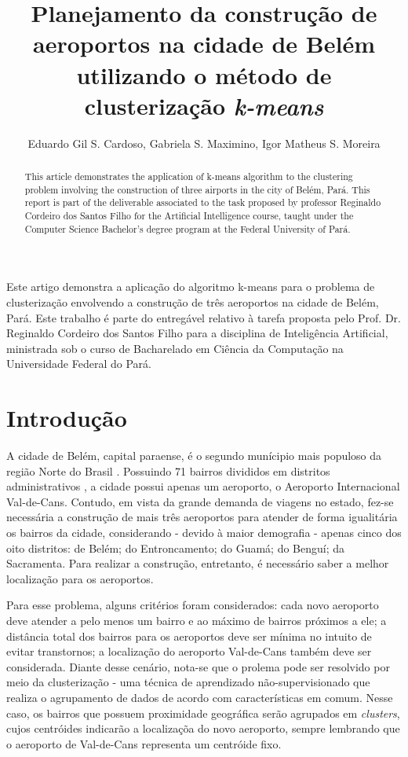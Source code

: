 \documentclass[12pt]{article}
\title{Planejamento da construção de aeroportos na cidade de Belém utilizando o método de clusterização \textit{k-means}}
\author{Eduardo Gil S. Cardoso\inst{1}, Gabriela S. Maximino\inst{1}, Igor Matheus S. Moreira\inst{1} }
\begin{document}
 

\maketitle

\begin{abstract}
  This article demonstrates the application of k-means algorithm to the clustering problem involving the construction of three airports in the city of Belém, Pará. This report is part of the deliverable associated to the task proposed by professor Reginaldo Cordeiro dos Santos Filho for the Artificial Intelligence course, taught under the Computer Science Bachelor's degree program at the Federal University of Pará.
\end{abstract}
     
\begin{resumo} 
  Este artigo demonstra a aplicação do algoritmo k-means para o problema de clusterização envolvendo a construção de três aeroportos na cidade de Belém, Pará. Este trabalho é parte do entregável relativo à tarefa proposta pelo Prof. Dr. Reginaldo Cordeiro dos Santos Filho para a disciplina de Inteligência Artificial, ministrada sob o curso de Bacharelado em Ciência da Computação na Universidade Federal do Pará.
\end{resumo}


\section{Introdução}
A cidade de Belém, capital paraense, é o segundo munícipio mais populoso da região Norte do Brasil \cite{ibge}. Possuindo 71 bairros divididos em distritos administrativos \cite{belemwiki}, a cidade possui apenas um aeroporto, o Aeroporto Internacional Val-de-Cans. Contudo, em vista da grande demanda de viagens no estado, fez-se necessária a construção de mais três aeroportos para atender de forma igualitária os bairros da cidade, considerando - devido à maior demografia - apenas cinco dos oito distritos: de Belém; do Entroncamento; do Guamá; do Benguí; da Sacramenta. Para realizar a construção, entretanto, é necessário saber a melhor localização para os aeroportos.

Para esse problema, alguns critérios foram considerados: cada novo aeroporto deve atender a pelo menos um bairro e ao máximo de bairros próximos a ele; a distância total dos bairros para os aeroportos deve ser mínima no intuito de evitar transtornos; a localização do aeroporto Val-de-Cans também deve ser considerada. Diante desse cenário, nota-se que o prolema pode ser resolvido por meio da clusterização - uma técnica de aprendizado não-supervisionado que realiza o agrupamento de dados de acordo com características em comum. Nesse caso, os bairros que possuem proximidade geográfica serão agrupados em \textit{clusters}, cujos centróides indicarão a localizaçõa do novo aeroporto, sempre lembrando que o aeroporto de Val-de-Cans representa um centróide fixo.
\end{document}
